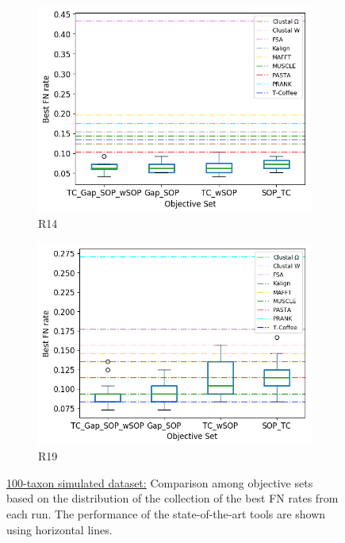\begin{figure}[!htbp]
	\begin{subfigure}{0.32\textwidth}
		\includegraphics[width=\columnwidth]{Figure/summary/precomputedInit/R14/objset_fnrate_rank}
		\caption{R14}
	\end{subfigure}
	\begin{subfigure}{0.32\textwidth}
		\includegraphics[width=\columnwidth]{Figure/summary/precomputedInit/R19/objset_fnrate_rank}
		\caption{R19}
	\end{subfigure}
	\caption{\underline{100-taxon simulated dataset:} Comparison among objective sets based on the distribution of the collection of the best FN rates from each run. The performance of the state-of-the-art tools are shown using horizontal lines.}
	\label{fig:rank_best_fn_rate}
\end{figure}



